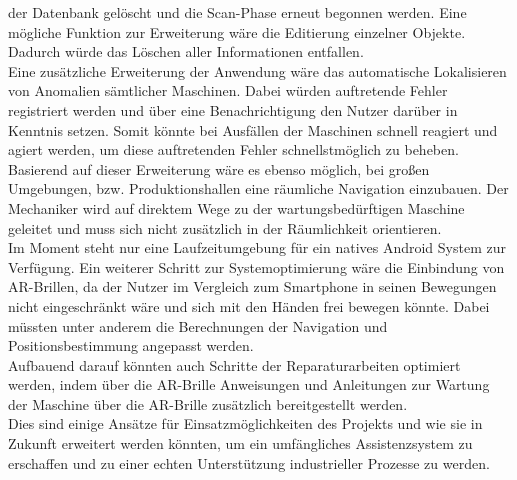 der Datenbank gelöscht und die Scan-Phase erneut begonnen werden. Eine mögliche Funktion zur Erweiterung wäre die Editierung einzelner Objekte. Dadurch würde das 
Löschen aller Informationen entfallen. 
\\ 
\linebreak
Eine zusätzliche Erweiterung der Anwendung wäre das automatische Lokalisieren von Anomalien sämtlicher Maschinen. Dabei würden auftretende Fehler registriert werden 
und über eine Benachrichtigung den Nutzer darüber in Kenntnis setzen. Somit könnte bei Ausfällen der Maschinen schnell reagiert und agiert werden, um diese auftretenden 
Fehler schnellstmöglich zu beheben. 
\\ 
Basierend auf dieser Erweiterung wäre es ebenso möglich, bei großen Umgebungen, bzw. Produktionshallen eine räumliche Navigation einzubauen. Der Mechaniker wird auf 
direktem Wege zu der wartungsbedürftigen Maschine geleitet und muss sich nicht zusätzlich in der Räumlichkeit orientieren. 
\\ 
\linebreak
Im Moment steht nur eine Laufzeitumgebung für ein natives Android System zur Verfügung. Ein weiterer Schritt zur Systemoptimierung wäre die Einbindung von \acs{AR}-Brillen, 
da der Nutzer im Vergleich zum Smartphone in seinen Bewegungen nicht eingeschränkt wäre und sich mit den Händen frei bewegen könnte. Dabei müssten unter anderem 
die Berechnungen der Navigation und Positionsbestimmung angepasst werden.
\\ 
Aufbauend darauf könnten auch Schritte der Reparaturarbeiten optimiert werden, indem über die \acs{AR}-Brille Anweisungen und Anleitungen zur Wartung der 
Maschine über die \acs{AR}-Brille zusätzlich bereitgestellt werden. 
\\ 
\linebreak
Dies sind einige Ansätze für Einsatzmöglichkeiten des Projekts und wie sie in Zukunft erweitert werden könnten, um ein umfängliches Assistenzsystem zu erschaffen und zu einer 
echten Unterstützung industrieller Prozesse zu werden.  
